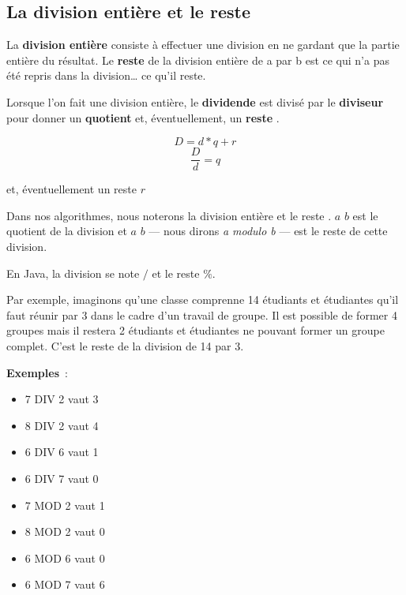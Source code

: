 		\subsection{La division entière et le reste}
		
			La \textbf{division entière} consiste à effectuer une division
			en ne gardant que la partie entière du résultat.
			Le \textbf{reste} de la division entière de a par b
			est ce qui n’a pas été repris dans la division… ce qu'il reste. 
			
			Lorsque l'on fait une division entière, le
			\textbf{dividende}  est divisé par le \textbf{diviseur} 
			pour donner un \textbf{quotient}  et, éventuellement, un
			\textbf{reste} .

			\[
				D = d * q + r 
			\]\[
				\frac{D}{d} = q 
			\]
			\begin{flushright}
				et, éventuellement un reste  $r$				
			\end{flushright}
				
			Dans nos algorithmes, nous noterons la division entière  et le
			reste . $a$  $b$ est le quotient de la division et
			$a$  $b$ — nous dirons \textit{a modulo b} — est le reste de
			cette division.  

			En Java, la division se note $/$ et le reste $\%$.
			
			Par exemple, imaginons qu’une classe comprenne 14 étudiants et
			étudiantes qu’il faut réunir par 3 dans le cadre d’un travail de
			groupe.  Il est possible de former 4 groupes mais il restera
			2 étudiants et étudiantes ne pouvant former un groupe complet.
			C’est le reste de la division de 14 par 3.
			
			\textbf{Exemples}~:	
			
			\begin{minipage}{9cm}
			\begin{multicols}{2}
			\begin{itemize}
				\item 7 DIV 2 vaut 3
				\item 8 DIV 2 vaut 4
				\item 6 DIV 6 vaut 1
				\item 6 DIV 7 vaut 0
				\item 7 MOD 2 vaut 1
				\item 8 MOD 2 vaut 0
				\item 6 MOD 6 vaut 0
				\item 6 MOD 7 vaut 6
			\end{itemize}
			\end{multicols}
			\end{minipage}

